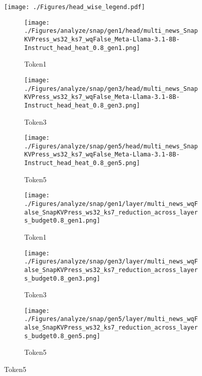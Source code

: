 
\begin{figure}[t]
	\centering
	\texttt{[image: ./Figures/head\_wise\_legend.pdf]}
	\begin{subfigure}[b]{0.32\linewidth}
		\texttt{[image: ./Figures/analyze/snap/gen1/head/multi\_news\_SnapKVPress\_ws32\_ks7\_wqFalse\_Meta-Llama-3.1-8B-Instruct\_head\_heat\_0.8\_gen1.png]}
		\vspace{-0.5cm}
		\caption{Token1 }
	\end{subfigure}
	\begin{subfigure}[b]{0.32\linewidth}		\texttt{[image: ./Figures/analyze/snap/gen3/head/multi\_news\_SnapKVPress\_ws32\_ks7\_wqFalse\_Meta-Llama-3.1-8B-Instruct\_head\_heat\_0.8\_gen3.png]}
		\vspace{-0.5cm}
		\caption{Token3 }
	\end{subfigure}
	\begin{subfigure}[b]{0.32\linewidth}
		\texttt{[image: ./Figures/analyze/snap/gen5/head/multi\_news\_SnapKVPress\_ws32\_ks7\_wqFalse\_Meta-Llama-3.1-8B-Instruct\_head\_heat\_0.8\_gen5.png]}
		\vspace{-0.5cm}
		\caption{Token5 }
	\end{subfigure}
	\vspace{-0.4cm}
	\caption{ Perturbation reduction across heads. (Llama)} 
	\label{fig:head_wise}
		\vspace{0.1cm}
	\begin{subfigure}[b]{0.32\linewidth}
		\texttt{[image: ./Figures/analyze/snap/gen1/layer/multi\_news\_wqFalse\_SnapKVPress\_ws32\_ks7\_reduction\_across\_layers\_budget0.8\_gen1.png]}
		\vspace{-0.5cm}
		\caption{Token1}
	\end{subfigure}
	\begin{subfigure}[b]{0.32\linewidth}		\texttt{[image: ./Figures/analyze/snap/gen3/layer/multi\_news\_wqFalse\_SnapKVPress\_ws32\_ks7\_reduction\_across\_layers\_budget0.8\_gen3.png]}
		\vspace{-0.5cm}
		\caption{Token3}
	\end{subfigure}
	\begin{subfigure}[b]{0.32\linewidth}
		\texttt{[image: ./Figures/analyze/snap/gen5/layer/multi\_news\_wqFalse\_SnapKVPress\_ws32\_ks7\_reduction\_across\_layers\_budget0.8\_gen5.png]}
		\vspace{-0.5cm}
		\caption{Token5}
	\end{subfigure}

\end{figure}
